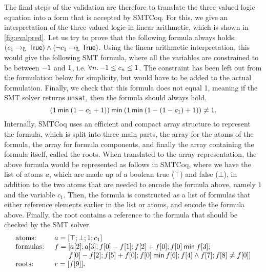 {The final steps of the validation are therefore to translate the three-valued
logic equation into a form that is accepted by SMTCoq.  For this, we give an interpretation of the three-valued logic in linear arithmetic, which is shown in \cref{fig:evalpred}.  Let us try to prove that the following formula always holds:
$\syniteformulanslk{c_1}{\predtrue}{\predtrue}$.  Using the linear arithmetic interpretation, this would give the following SMT formula, where all
the variables are constrained to be between $-1$ and $1$, i.e.
$\forall n\ldotp -1 \leq c_n \leq 1$.  The constraint has been left
out from the formulation below for simplicity, but would have to be added to the
actual formulation.  Finally, we check that this formula does not equal 1,
meaning if the SMT solver returns \texttt{unsat}, then the formula should always
hold.
%
\begin{equation}
  (1 \mathbin{\textsf{min}} (1 - c_1 + 1)) \mathbin{\textsf{min}} (1 \mathbin{\textsf{min}} (1 - (1 - c_1) + 1)) \neq 1.
\end{equation}
%
Internally, SMTCoq uses an efficient
and compact array structure to represent the formula, which is split into three
main parts, the array for the atoms of the formula, the array for formula
components, and finally the array containing the formula itself, called the
roots.  When translated to the array representation, the above formula would be represented as follows
in SMTCoq, where we have the list of atoms $a$, which are made up of a boolean
true ($\top$) and false ($\bot$), in addition to the two atoms that are needed
to encode the formula above, namely $1$ and the variable $c_1$.  Then, the
formula is constructed as a list of formulas that either reference elements
earlier in the list or atoms, and encode the formula above.  Finally, the root
contains a reference to the formula that should be checked by the SMT solver.
%
\begin{equation}
  \begin{array}{ll}
    \text{atoms: } & a = [\top; \bot; 1; c_1]\\
    \text{formulas: } & f = [a[2]; a[3]; f[0] - f[1]; f[2] + f[0]; f[0]
                        \mathbin{\textsf{min}} f[3];\\
                   & \qquad f[0] - f[2]; f[5] + f[0]; f[0] \mathbin{\textsf{min}}
                     f[6]; f[4] \land f[7]; f[8] \neq f[0]]\\
    \text{roots: } & r = [f[9]].
  \end{array}
\end{equation}

}
